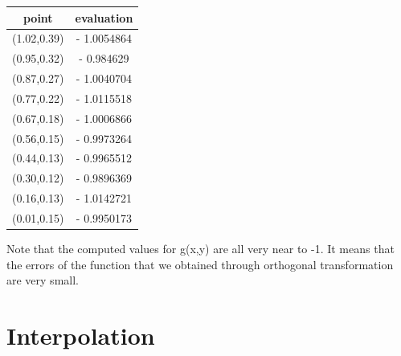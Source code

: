 \documentclass[a4paper]{article}
\newcommand{\head}[1]{\textnormal{\textbf{#1}}}
\begin{document}
\begin{center}
			\begin{tabular}{c c}
				\hline
				\head{ point } & \head{ evaluation}\\
				\hline
				(1.02,0.39) & - 1.0054864 \\
				(0.95,0.32) & - 0.984629   \\
				(0.87,0.27) & - 1.0040704  \\
				(0.77,0.22) & - 1.0115518    \\
				(0.67,0.18) & - 1.0006866      \\
				(0.56,0.15) & - 0.9973264      \\
				(0.44,0.13) & - 0.9965512     \\
			           (0.30,0.12) & - 0.9896369    \\
				(0.16,0.13) & - 1.0142721  \\
				(0.01,0.15) & - 0.9950173   \\


				\hline
			\end{tabular}
\end{center}

Note that the computed values for g(x,y) are all very near to -1. It means that the errors of the function that we obtained through orthogonal transformation are very small. 


	\section{Interpolation}
\end{document}

